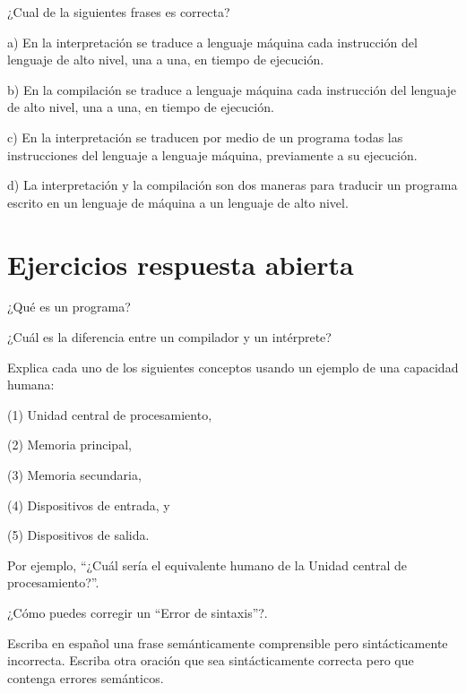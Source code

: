 \begin{ejercicio}¿Cual de la siguientes frases es correcta?

a) En la interpretación se traduce a lenguaje máquina cada instrucción del lenguaje de alto nivel, una a una, en tiempo de ejecución.%

b) En la compilación se traduce a lenguaje máquina cada instrucción del lenguaje de alto nivel, una a una, en tiempo de ejecución.

c) En la interpretación se traducen por medio de un programa todas las instrucciones del lenguaje a lenguaje máquina, previamente a su ejecución.

d) La interpretación y la compilación son dos maneras para traducir un programa escrito en un lenguaje de máquina a un lenguaje de alto nivel.

\end{ejercicio}


\section*{Ejercicios respuesta abierta}\label{ejercicios.abierta}



\begin{ejercicio}¿Qué es un programa?\end{ejercicio}

\begin{ejercicio}¿Cuál es la diferencia entre un compilador y un intérprete?\end{ejercicio}

\begin{ejercicio} Explica cada uno de los siguientes conceptos
usando un ejemplo de una capacidad humana:

(1) Unidad central de
procesamiento, 

(2) Memoria principal, 

(3) Memoria secundaria, 

(4)
Dispositivos de entrada, y 

(5) Dispositivos de salida. 

Por ejemplo,
``¿Cuál sería el equivalente humano de la Unidad central de
procesamiento?''.
\end{ejercicio}

\begin{ejercicio} ¿Cómo puedes corregir un ``Error de sintaxis''?.\end{ejercicio}

\begin{ejercicio} Escriba en español una frase semánticamente
comprensible pero sintácticamente incorrecta. Escriba otra oración que
sea sintácticamente correcta pero que contenga errores semánticos.

\end{ejercicio}
